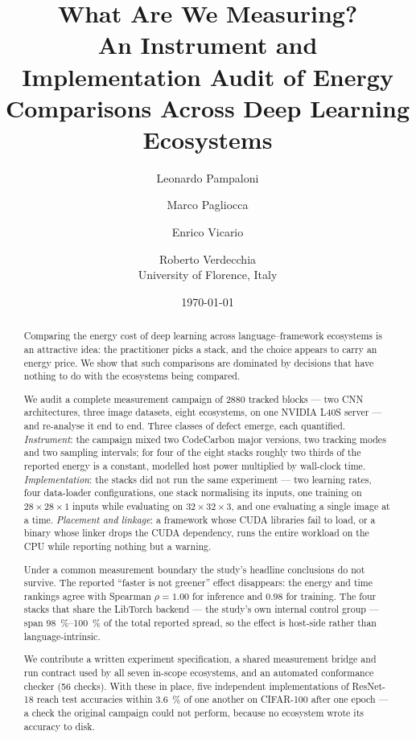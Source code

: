 \documentclass[11pt,a4paper]{article}
\title{\bfseries What Are We Measuring?\\[2pt]
\large An Instrument and Implementation Audit of Energy\\
Comparisons Across Deep Learning Ecosystems}
\author{%
Leonardo Pampaloni \and Marco Pagliocca \and Enrico Vicario \and Roberto Verdecchia\\[2pt]
\small University of Florence, Italy
}
\date{\today}
\begin{document}
\maketitle

\begin{abstract}
\noindent
Comparing the energy cost of deep learning across language--framework ecosystems
is an attractive idea: the practitioner picks a stack, and the choice appears to
carry an energy price. We show that such comparisons are dominated by decisions
that have nothing to do with the ecosystems being compared.

We audit a complete measurement campaign of \num{2880} tracked blocks --- two
CNN architectures, three image datasets, eight ecosystems, on one NVIDIA L40S
server --- and re-analyse it end to end. Three classes of defect emerge, each
quantified. \emph{Instrument}: the campaign mixed two CodeCarbon major versions,
two tracking modes and two sampling intervals; for four of the eight stacks
roughly two thirds of the reported energy is a constant, modelled host power
multiplied by wall-clock time. \emph{Implementation}: the stacks did not run the
same experiment --- two learning rates, four data-loader configurations, one
stack normalising its inputs, one training on \(28\times28\times1\) inputs while
evaluating on \(32\times32\times3\), and one evaluating a single image at a time.
\emph{Placement and linkage}: a framework whose CUDA libraries fail to load, or a
binary whose linker drops the CUDA dependency, runs the entire workload on the
CPU while reporting nothing but a warning.

Under a common measurement boundary the study's headline conclusions do not
survive. The reported ``faster is not greener'' effect disappears: the energy and
time rankings agree with Spearman \(\rho=1.00\) for inference and \(0.98\) for
training. The four stacks that share the LibTorch backend --- the study's own
internal control group --- span \SIrange{98}{100}{\percent} of the total reported
spread, so the effect is host-side rather than language-intrinsic.

We contribute a written experiment specification, a shared measurement bridge and
run contract used by all seven in-scope ecosystems, and an automated conformance
checker (56 checks). With these in place, five independent implementations of
ResNet-18 reach test accuracies within \SI{3.6}{\percent} of one another on
CIFAR-100 after one epoch --- a check the original campaign could not perform,
because no ecosystem wrote its accuracy to disk.
\end{abstract}
\end{document}
